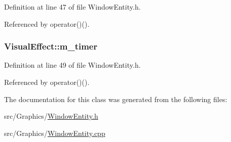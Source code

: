 Definition at line 47 of file Window\-Entity.\-h.



Referenced by operator()().

\hypertarget{class_visual_effect_a810d29aed760dcfe3b1bd6e0fd85243a}{
\subsubsection[{m\-\_\-timer}]{ Visual\-Effect\-::m\-\_\-timer\hspace{0.3cm}{\ttfamily [protected]}}}\label{class_visual_effect_a810d29aed760dcfe3b1bd6e0fd85243a}


Definition at line 49 of file Window\-Entity.\-h.



Referenced by operator()().



The documentation for this class was generated from the following files\-:\begin{DoxyCompactItemize}
\item 
src/\-Graphics/\hyperlink{_window_entity_8h}{Window\-Entity.\-h}\item 
src/\-Graphics/\hyperlink{_window_entity_8cpp}{Window\-Entity.\-cpp}\end{DoxyCompactItemize}

